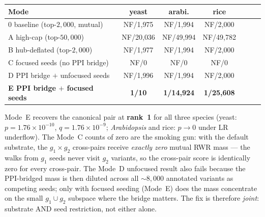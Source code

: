 \begin{center}\small
\begin{tabular}{lcccccc}
\toprule
Mode                                 & yeast    & arabi.   & rice    \\
\midrule
0 baseline (top-$2{,}000$, mutual)   & NF/1{,}975 & NF/1{,}994 & NF/2{,}000\\
A high-cap (top-$50{,}000$)          & NF/20{,}036 & NF/49{,}994 & NF/49{,}782\\
B hub-deflated (top-$2{,}000$)       & NF/1{,}977 & NF/1{,}994 & NF/2{,}000\\
C focused seeds (no PPI bridge)      & NF/0     & NF/0     & NF/0    \\
D PPI bridge $+$ unfocused seeds     & NF/1{,}996 & NF/1{,}994 & NF/2{,}000\\
\textbf{E PPI bridge $+$ focused seeds} & \textbf{1/10} & \textbf{1/14{,}924} & \textbf{1/25{,}608}\\
\bottomrule
\end{tabular}
\end{center}

Mode~E recovers the canonical pair at \textbf{rank~1} for all three
species (yeast: $p=1.76\!\times\!10^{-10}$, $q=1.76\!\times\!10^{-9}$;
\emph{Arabidopsis} and rice: $p\to 0$ under LR underflow). The Mode~C
counts of zero are the smoking gun: with the default substrate, the
$g_1\!\times\!g_2$ cross-pairs receive \emph{exactly zero} mutual RWR
mass --- the walks from $g_1$ seeds never visit $g_2$ variants, so the
cross-pair score is identically zero for every cross-pair. The Mode~D
unfocused result also fails because the PPI-bridged mass is then
diluted across all $\sim 8{,}000$ annotated variants as competing
seeds; only with focused seeding (Mode~E) does the mass
concentrate on the small $g_1\cup g_2$ subspace where the bridge
matters. The fix is therefore \emph{joint}: substrate AND seed
restriction, not either alone.

